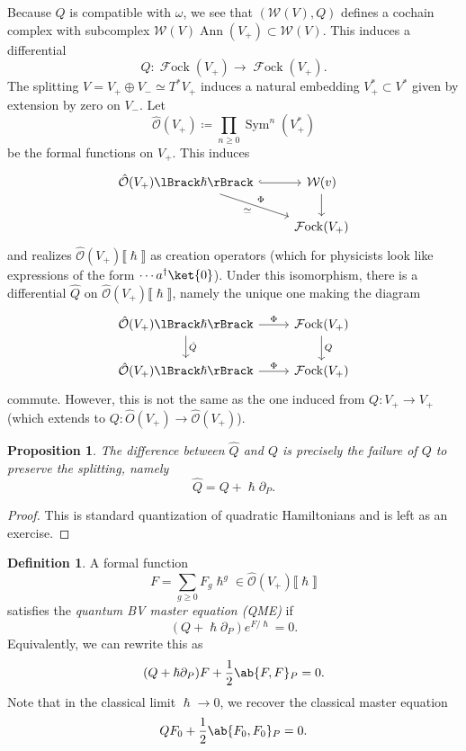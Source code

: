 \documentclass{amsart}
\newtheorem{prop}[thm]{Proposition}
\theoremstyle{definition}
\newtheorem{defn}[thm]{Definition}
\theoremstyle{remark}
\theoremstyle{plain}
\theoremstyle{definition}
\theoremstyle{remark}
\newcommand{\mc}[1]{\mathcal{#1}}
\newcommand{\on}[1]{\operatorname{#1}}
\newcommand{\1}{\mathbf{1}}
\newcommand{\2}{\mathbf{2}}
\newcommand{\3}{\mathbf{3}}
\newcommand{\ps}[1]{\lBrack #1 \rBrack}
\DeclareMathOperator{\Sym}{Sym}
\DeclareMathOperator{\Fock}{\mc{F}ock}
\begin{document}
Because \(Q\) is compatible with \(\omega\), we see that \((\mc{W}(V), Q)\) defines a cochain complex with subcomplex \(\mc{W}(V) \on{Ann}(V_+) \subset \mc{W}(V)\). This induces a differential
\[ Q \colon \Fock(V_+) \to \Fock(V_+). \]
The splitting \(V = V_+ \oplus V_- \simeq T^* V_+\) induces a natural embedding \(V_+^* \subset V^*\) given by extension by zero on \(V_-\). Let
\[ \hat{\mc{O}}(V_+) \coloneqq \prod_{n \geq 0} \Sym^n (V_+^*) \]
be the formal functions on \(V_+\). This induces
\begin{equation*}
\begin{tikzcd}
    \hat{\mc{O}}(V_+)\ps{\hslash} \ar[hookrightarrow]{r} \ar{dr}{\Phi}[swap]{\simeq} & \mc{W}(v) \ar{d} \\
    & \Fock(V_+)
\end{tikzcd}
\end{equation*}
and realizes \(\hat{\mc{O}}(V_+) \ps{\hslash}\) as creation operators (which for physicists look like expressions of the form \(\cdots a^{\dagger} \ket{0}\)). Under this isomorphism, there is a differential \(\hat{Q}\) on \(\hat{\mc{O}}(V_+) \ps{\hslash}\), namely the unique one making the diagram
\begin{equation*}
\begin{tikzcd}
    \hat{\mc{O}}(V_+) \ps{\hslash} \ar{r}{\Phi} \ar{d}{\hat{Q}} & \Fock(V_+) \ar{d}{Q} \\
    \hat{\mc{O}}(V_+) \ps{\hslash} \ar{r}{\Phi} & \Fock(V_+)
\end{tikzcd}
\end{equation*}
commute. However, this is not the same as the one induced from \(Q \colon V_+ \to V_+\) (which extends to \(Q \colon \hat{O}(V_+) \to \hat{\mc{O}}(V_+)\)).

\begin{prop}
    The difference between \(\hat{Q}\) and \(Q\) is precisely the failure of \(Q\) to preserve the splitting, namely
    \[ \hat{Q} = Q + \hslash \partial_P. \]
\end{prop}

\begin{proof}
    This is standard quantization of quadratic Hamiltonians and is left as an exercise.
\end{proof}

\begin{defn}
    A formal function
    \[ F = \sum_{g \geq 0} F_g \hslash^g \in \hat{\mc{O}}(V_+) \ps{\hslash} \]
    satisfies the \textit{quantum BV master equation (QME)} if
    \[ (Q + \hslash \partial_P) e^{F/\hslash} = 0. \]
    Equivalently, we can rewrite this as
    \[ (Q + \hslash \partial_P) F + \frac{1}{2} \ab\{ F, F \}_P = 0. \]
    Note that in the classical limit \(\hslash \to 0\), we recover the classical master equation
    \[ Q F_0 + \frac{1}{2} \ab\{ F_0, F_0 \}_P = 0. \]
\end{defn}
\end{document}
